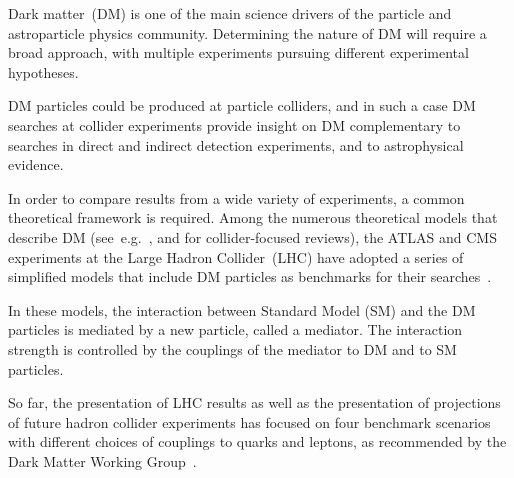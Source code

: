 \documentclass[a4paper,11pt,notoc]{article}
\begin{document}
\author[12]{Felix~Yu}

\author[13]{Lian-Tao~Wang}




\renewcommand\contentsname{} %

\notoc 

\maketitle


\vskip20pt


Dark matter~(DM) is one of the main science drivers of the particle and astroparticle physics community.  
Determining the nature of DM will require a broad approach, with multiple experiments pursuing different experimental hypotheses.

DM particles could be produced at particle colliders, and in such a case DM searches at collider experiments provide insight on DM complementary to searches in direct and indirect detection experiments, and to astrophysical evidence.

In order to compare results from a wide variety of experiments, a common theoretical framework is required. Among the numerous theoretical models that describe DM  (see~e.g.~\cite{doi:10.1146/annurev-astro-082708-101659}, and \cite{Kahlhoefer:2017dnp,doi:10.1146/annurev-nucl-101917-021008} for collider-focused reviews), the ATLAS and CMS experiments at the Large Hadron Collider~(LHC) have adopted a series of simplified models that include DM  particles as benchmarks for their searches~\cite{ABERCROMBIE2020100371}.

In these models, the interaction between Standard Model (SM) and the DM particles is mediated by a new particle, called a mediator. The interaction strength is controlled by the couplings of the mediator to DM and to SM particles. 

So far, the presentation of LHC results as well as the presentation of projections of future hadron collider experiments has focused on four benchmark scenarios with different choices of couplings to quarks and leptons, as recommended by the Dark Matter Working Group~\cite{BOVEIA2020100365, ALBERT2019100377}.
\end{document}
